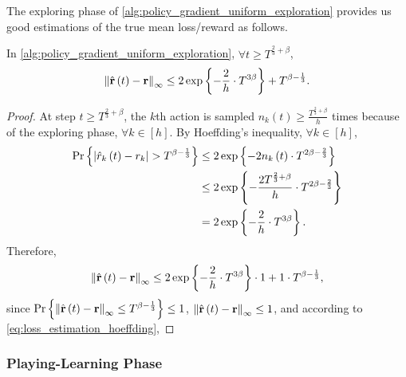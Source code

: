 The exploring phase of \cref{alg:policy_gradient_uniform_exploration} provides us good estimations of the true mean loss/reward as follows.
\begin{thm}
\label{thm:reward_estimation_hoeffding}
    In \cref{alg:policy_gradient_uniform_exploration}, $\forall t \ge T^{\frac{2}{3} + \beta}$,
\begin{equation*}
    \left\| \hat{{\mathbf{r}}}\left(t\right) - {\mathbf{r}} \right\|_\infty \le 2 \exp\left\{ - \frac{2}{h} \cdot  T^{3\beta} \right\} + T^{\beta - \frac{1}{3}}.
\end{equation*}
\end{thm}
\begin{proof}
    At step $t \ge T^{\frac{2}{3} + \beta}$, the $k$th action is sampled $n_{k}\left(t\right) \ge \frac{T^{\frac{2}{3} + \beta} }{h}$ times because of the exploring phase, $\forall k \in [h]$. By Hoeffding's inequality, $\forall k \in [h]$,
\begin{equation}
\label{eq:loss_estimation_hoeffding}
\begin{split}
    {\text{Pr}}\left\{ \left| \hat{r}_{ k}\left(t\right) - r_{k} \right| > T^{\beta - \frac{1}{3}} \right\} &\le 2 \exp\left\{ - 2 n_{ k}\left(t\right) \cdot T^{2\beta - \frac{2}{3}} \right\} \\
    &\le 2 \exp\left\{ -  \frac{2 T^{\frac{2}{3} + \beta}}{h} \cdot T^{2\beta - \frac{2}{3}} \right\} \\
    &= 2 \exp\left\{ - \frac{2}{h} \cdot  T^{3\beta} \right\}.
\end{split}
\end{equation}
Therefore,
\begin{equation*}
\begin{split}
    \left\| \hat{{\mathbf{r}}}\left(t\right) - {\mathbf{r}} \right\|_\infty \le 2 \exp\left\{ - \frac{2}{h} \cdot  T^{3\beta} \right\} \cdot 1 + 1 \cdot T^{\beta - \frac{1}{3}},
\end{split}
\end{equation*}
since ${\text{Pr}}\left\{ \left\| \hat{{\mathbf{r}}}\left(t\right) - {\mathbf{r}} \right\|_\infty \le T^{\beta - \frac{1}{3}} \right\} \le 1$, $\left\| \hat{{\mathbf{r}}}\left(t\right) - {\mathbf{r}} \right\|_\infty \le 1$, and according to \cref{eq:loss_estimation_hoeffding}, 
\end{proof}

\subsubsection{Playing-Learning Phase}
\label{subsubsec:playing_learning_phase}

